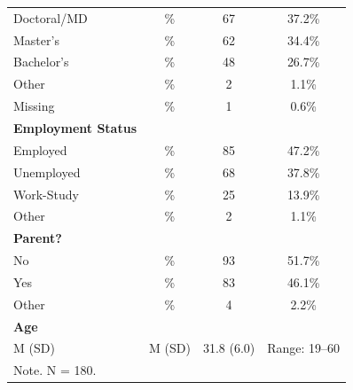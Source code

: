 \begin{table}[H]
\begin{tabular}{lccc}
\hspace{1em}  Doctoral/MD & \% & 67 & 37.2\% \\
\hspace{1em}  Master's & \% & 62 & 34.4\% \\
\hspace{1em}  Bachelor's & \% & 48 & 26.7\% \\
\hspace{1em}  Other & \% & 2 & 1.1\% \\
\hspace{1em}  Missing & \% & 1 & 0.6\% \\
\textbf{Employment Status} & & & \\
\hspace{1em}  Employed & \% & 85 & 47.2\% \\
\hspace{1em}  Unemployed & \% & 68 & 37.8\% \\
\hspace{1em}  Work-Study & \% & 25 & 13.9\% \\
\hspace{1em}  Other & \% & 2 & 1.1\% \\
\textbf{Parent?} & & & \\
\hspace{1em}  No & \% & 93 & 51.7\% \\
\hspace{1em}  Yes & \% & 83 & 46.1\% \\
\hspace{1em}  Other & \% & 4 & 2.2\% \\
\textbf{Age} & & & \\
\hspace{1em}  M (SD) & M (SD) & 31.8 (6.0) & Range: 19–60 \\
\bottomrule
\multicolumn{4}{l}{\footnotesize Note. N = 180.} \\
\end{tabular}
\end{table}
